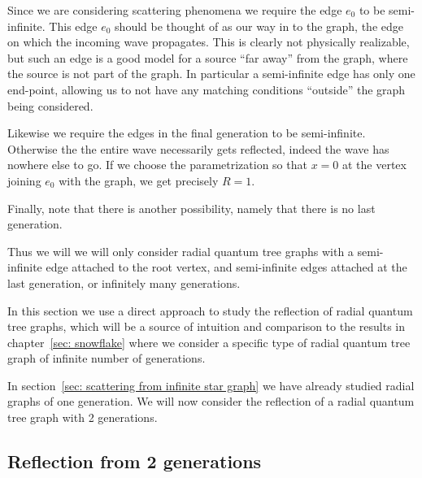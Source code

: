 
\begin{remark}\label{rem: semi-infinite edges for scattering}
  Since we are considering scattering phenomena we require the edge $e_0$ to be semi-infinite. This edge $e_0$ should be thought of as our way in to the graph, the edge on which the incoming wave propagates. This is clearly not physically realizable, but such an edge is a good model for a source ``far away'' from the graph, where the source is not part of the graph. In particular a semi-infinite edge has only one end-point, allowing us to not have any matching conditions ``outside'' the graph being considered.

  Likewise we require the edges in the final generation to be semi-infinite. Otherwise the the entire wave necessarily gets reflected, indeed the wave has nowhere else to go. If we choose the parametrization so that $x=0$ at the vertex joining $e_0$ with the graph, we get precisely $R=1$.

  Finally, note that there is another possibility, namely that there is no last generation.

  Thus we will we will only consider radial quantum tree graphs with a semi-infinite edge attached to the root vertex, and semi-infinite edges attached at the last generation, or infinitely many generations.
\end{remark}

In this section we use a direct approach to study the reflection of radial quantum tree graphs, which will be a source of intuition and comparison to the results in chapter~\ref{sec: snowflake} where we consider a specific type of radial quantum tree graph of infinite number of generations.

In section~\ref{sec: scattering from infinite star graph} we have already studied radial graphs of one generation. We will now consider the reflection of a radial quantum tree graph with 2 generations.



\subsection{Reflection from 2 generations}\label{sec: 2 gen matrix}

